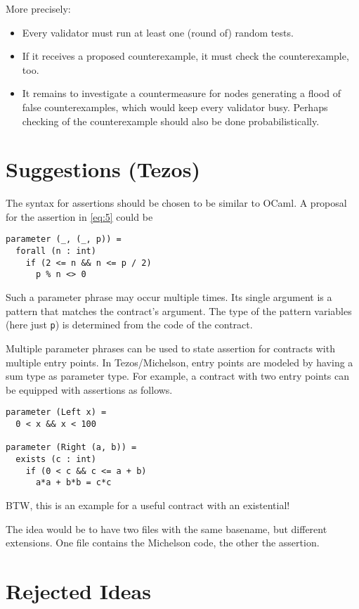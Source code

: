 \documentclass{article}
\begin{document}
\begin{itemize}
  More precisely:
  \begin{itemize}
  \item Every validator must run at least one (round of) random tests.  
  \item If it receives a proposed counterexample, it must check the counterexample,
    too.
  \item It remains to investigate a countermeasure for nodes generating a flood of
    false counterexamples, which would keep every validator busy. Perhaps checking of
    the counterexample should also be done probabilistically.
  \end{itemize}
\end{itemize}

\section{Suggestions (Tezos)}
\label{sec:suggestions-tezos}

The syntax for assertions should be chosen to be similar to OCaml.
A proposal for the assertion in \eqref{eq:5} could be
\begin{lstlisting}[language=caml]
parameter (_, (_, p)) =
  forall (n : int)
    if (2 <= n && n <= p / 2)
      p % n <> 0
\end{lstlisting}
Such a parameter phrase may occur multiple times. Its single argument
is a pattern that matches the contract's argument. The type of the
pattern variables (here just \lstinline/p/) is determined from the code of the
contract.

Multiple parameter phrases can be used to state assertion for
contracts with multiple entry points. In Tezos/Michelson, entry points are
modeled by having a sum type as parameter type. For example, a
contract with two entry points can be equipped with assertions as
follows.
\begin{lstlisting}[language=caml]
parameter (Left x) =
  0 < x && x < 100

parameter (Right (a, b)) =
  exists (c : int)
    if (0 < c && c <= a + b)
      a*a + b*b = c*c
\end{lstlisting}
BTW, this is an example for a useful contract with an existential!

The idea would be to have two files with the same basename, but
different extensions. One file contains the Michelson code, the other
the assertion.

\section{Rejected Ideas}
\label{sec:rejected-ideas}
\end{document}
